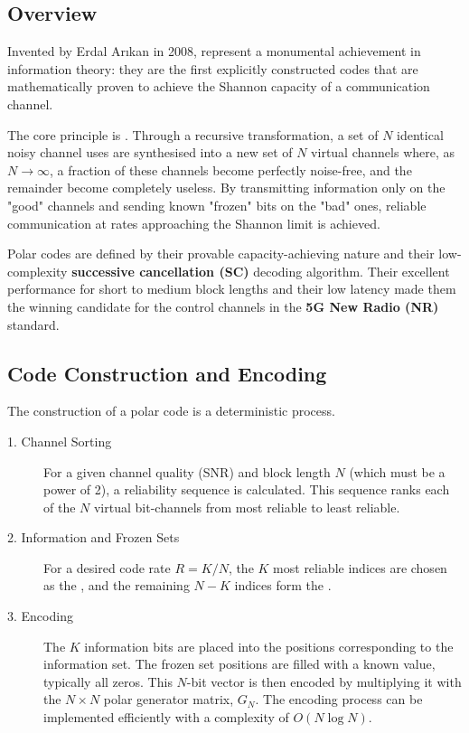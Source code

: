 \subsection{Overview}

Invented by Erdal Arıkan in 2008,  represent a monumental achievement in information theory: they are the first explicitly constructed codes that are mathematically proven to achieve the Shannon capacity of a communication channel.

The core principle is . Through a recursive transformation, a set of $N$ identical noisy channel uses are synthesised into a new set of $N$ virtual channels where, as $N \to \infty$, a fraction of these channels become perfectly noise-free, and the remainder become completely useless. By transmitting information only on the "good" channels and sending known "frozen" bits on the "bad" ones, reliable communication at rates approaching the Shannon limit is achieved.

\begin{keyconcept}
    Polar codes are defined by their provable capacity-achieving nature and their low-complexity \textbf{successive cancellation (SC)} decoding algorithm. Their excellent performance for short to medium block lengths and their low latency made them the winning candidate for the control channels in the \textbf{5G New Radio (NR)} standard.
\end{keyconcept}


\subsection{Code Construction and Encoding}

The construction of a polar code is a deterministic process.
\begin{description}
    \item[1. Channel Sorting] For a given channel quality (SNR) and block length $N$ (which must be a power of 2), a reliability sequence is calculated. This sequence ranks each of the $N$ virtual bit-channels from most reliable to least reliable.
    \item[2. Information and Frozen Sets] For a desired code rate $R=K/N$, the $K$ most reliable indices are chosen as the , and the remaining $N-K$ indices form the .
    \item[3. Encoding] The $K$ information bits are placed into the positions corresponding to the information set. The frozen set positions are filled with a known value, typically all zeros. This $N$-bit vector is then encoded by multiplying it with the $N \times N$ polar generator matrix, $G_N$. The encoding process can be implemented efficiently with a complexity of $O(N \log N)$.
\end{description}



